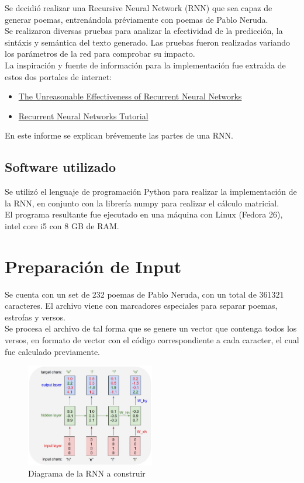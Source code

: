 \documentclass[11pt,letterpaper]{article}
\begin{document}
Se decidió realizar una Recursive Neural Network (RNN) que sea capaz de 
generar poemas, entrenándola préviamente con poemas de Pablo Neruda.\\

Se realizaron diversas pruebas para analizar la efectividad de la predicción, 
la sintáxis y semántica del texto generado. Las pruebas fueron realizadas 
variando los parámetros de la red para comprobar su impacto.\\

La inspiración y fuente de información para la implementación fue extraída de estos dos portales 
de internet:

\begin{itemize}
	\item \href{http://karpathy.github.io/2015/05/21/rnn-effectiveness/}{The Unreasonable Effectiveness of Recurrent Neural Networks}
	\item \href{http://www.wildml.com/2015/09/recurrent-neural-networks-tutorial-part-1-introduction-to-rnns/}{Recurrent Neural Networks Tutorial}
\end{itemize}

En este informe se explican brévemente las partes de una RNN.
\subsection{Software utilizado}
Se utilizó el lenguaje de programación Python para realizar la implementación de
la RNN, en conjunto con la librería numpy para realizar el 
cálculo matricial.\\

El programa resultante fue ejecutado en una máquina con Linux (Fedora 26),
intel core i5 con 8 GB de RAM.
\clearpage
\section{Preparación de Input}
Se cuenta con un set de 232 poemas de Pablo Neruda, con un total de $361321$ caracteres. 
El archivo viene con marcadores especiales para separar poemas, estrofas y versos.\\

Se procesa el archivo de tal forma que se genere un vector que contenga todos los versos, 
en formato de vector con el código correspondiente a cada caracter, el cual fue calculado 
previamente.

\begin{figure}[ht!]
\centering \includegraphics[width=0.5\textwidth]{img/charseq.jpeg}
\caption{Diagrama de la RNN a construir} \label{img1}
\end{figure}
\end{document}
